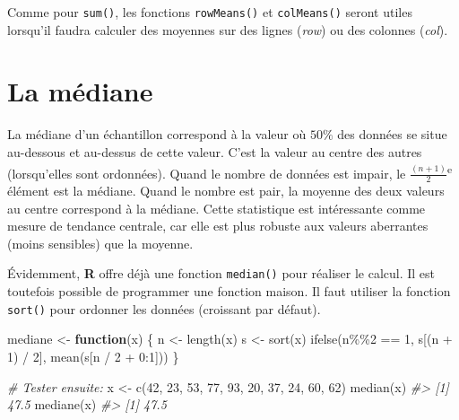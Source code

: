 \documentclass[
]{book}
\newenvironment{Shaded}{}{}
\newcommand{\CommentTok}[1]{\textit{#1}}
\newcommand{\ControlFlowTok}[1]{\textbf{#1}}
\newcommand{\DecValTok}[1]{#1}
\newcommand{\FunctionTok}[1]{#1}
\newcommand{\NormalTok}[1]{#1}
\newcommand{\OtherTok}[1]{#1}
\newcommand{\SpecialCharTok}[1]{#1}
\begin{document}
Comme pour \texttt{sum()}, les fonctions \texttt{rowMeans()} et \texttt{colMeans()} seront utiles lorsqu'il faudra calculer des moyennes sur des lignes (\emph{row}) ou des colonnes (\emph{col}).

\hypertarget{la-muxe9diane}{%
\section{La médiane}\label{la-muxe9diane}}

La médiane d'un échantillon correspond à la valeur où \(50\%\) des données se situe au-dessous et au-dessus de cette valeur. C'est la valeur au centre des autres (lorsqu'elles sont ordonnées). Quand le nombre de données est impair, le \(\frac{(n+1)}{2}\)\textsuperscript{e} élément est la médiane. Quand le nombre est pair, la moyenne des deux valeurs au centre correspond à la médiane. Cette statistique est intéressante comme mesure de tendance centrale, car elle est plus robuste aux valeurs aberrantes (moins sensibles) que la moyenne.

Évidemment, \textbf{R} offre déjà une fonction \texttt{median()} pour réaliser le calcul. Il est toutefois possible de programmer une fonction maison. Il faut utiliser la fonction \texttt{sort()} pour ordonner les données (croissant par défaut).

\begin{Shaded}
\begin{Highlighting}[]
\NormalTok{mediane }\OtherTok{\textless{}{-}} \ControlFlowTok{function}\NormalTok{(x) \{}
\NormalTok{  n }\OtherTok{\textless{}{-}} \FunctionTok{length}\NormalTok{(x)}
\NormalTok{  s }\OtherTok{\textless{}{-}} \FunctionTok{sort}\NormalTok{(x)}
  \FunctionTok{ifelse}\NormalTok{(n}\SpecialCharTok{\%\%}\DecValTok{2} \SpecialCharTok{==} \DecValTok{1}\NormalTok{, s[(n }\SpecialCharTok{+} \DecValTok{1}\NormalTok{) }\SpecialCharTok{/} \DecValTok{2}\NormalTok{], }\FunctionTok{mean}\NormalTok{(s[n }\SpecialCharTok{/} \DecValTok{2} \SpecialCharTok{+} \DecValTok{0}\SpecialCharTok{:}\DecValTok{1}\NormalTok{]))}
\NormalTok{\}}

\CommentTok{\# Tester ensuite:}
\NormalTok{x }\OtherTok{\textless{}{-}} \FunctionTok{c}\NormalTok{(}\DecValTok{42}\NormalTok{, }\DecValTok{23}\NormalTok{, }\DecValTok{53}\NormalTok{, }\DecValTok{77}\NormalTok{, }\DecValTok{93}\NormalTok{, }\DecValTok{20}\NormalTok{, }\DecValTok{37}\NormalTok{, }\DecValTok{24}\NormalTok{, }\DecValTok{60}\NormalTok{, }\DecValTok{62}\NormalTok{)}
\FunctionTok{median}\NormalTok{(x)}
\CommentTok{\#\textgreater{} [1] 47.5}
\FunctionTok{mediane}\NormalTok{(x)}
\CommentTok{\#\textgreater{} [1] 47.5}
\end{Highlighting}
\end{Shaded}
\end{document}
